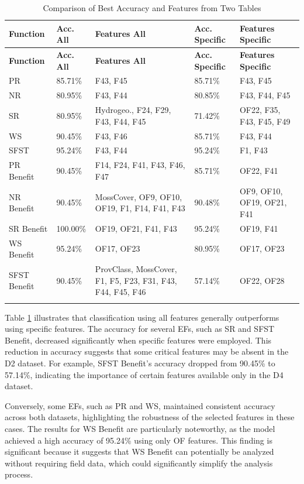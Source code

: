 \documentclass[12pt,letterpaper]{article}
\begin{document}
\begin{longtable}{|p{3cm}|p{2cm}|p{3cm}|p{2cm}|p{3cm}|}
\hline
\textbf{Function} & \textbf{Acc. All} & \textbf{Features All} & \textbf{Acc. Specific} & \textbf{Features Specific} \\ \hline
\endfirsthead
\hline
\textbf{Function} & \textbf{Acc. All} & \textbf{Features All} & \textbf{Acc. Specific} & \textbf{Features Specific} \\ \hline
\endhead

PR & 85.71\% & F43, F45 & 85.71\% & F43, F45 \\ \hline
NR & 80.95\% & F43, F44 & 80.85\% & F43, F44, F45 \\ \hline
SR & 80.95\% & Hydrogeo., F24, F29, F43, F44, F45 & 71.42\% & OF22, F35, F43, F45, F49 \\ \hline
WS & 90.45\% & F43, F46 & 85.71\% & F43, F44 \\ \hline
SFST & 95.24\% & F43, F44 & 95.24\% & F1, F43 \\ \hline
PR Benefit & 90.45\% & F14, F24, F41, F43, F46, F47 & 85.71\% & OF22, F41 \\ \hline
NR Benefit & 90.45\% & MossCover, OF9, OF10, OF19, F1, F14, F41, F43 & 90.48\% & OF9, OF10, OF19, OF21, F41 \\ \hline
SR Benefit & 100.00\% & OF19, OF21, F41, F43 & 95.24\% & OF19, F41 \\ \hline
WS Benefit & 95.24\% & OF17, OF23 & 80.95\% & OF17, OF23 \\ \hline
SFST Benefit & 90.45\% & ProvClass, MossCover, F1, F5, F23, F31, F43, F44, F45, F46 & 57.14\% & OF22, OF28 \\ \hline
\caption{Comparison of Best Accuracy and Features from Two Tables}
\label{tab_combined:featred_accuracy}
\end{longtable}

Table \ref{tab_combined:featred_accuracy} illustrates that classification using all features generally outperforms using specific features.
The accuracy for several \acp{EF}, such as \ac{SR} and \ac{SFST} Benefit, decreased significantly when specific features were employed.
This reduction in accuracy suggests that some critical features may be absent in the D2 dataset.
For example, \ac{SFST} Benefit's accuracy dropped from 90.45\% to 57.14\%, indicating the importance of certain features available only in the D4 dataset.

Conversely, some \acp{EF}, such as \ac{PR} and \ac{WS}, maintained consistent accuracy across both datasets, highlighting the robustness of the selected features in these cases.
The results for \ac{WS} Benefit are particularly noteworthy, as the model achieved a high accuracy of 95.24\% using only \ac{OF} features.
This finding is significant because it suggests that \ac{WS} Benefit can potentially be analyzed without requiring field data, which could significantly simplify the analysis process.
\end{document}
